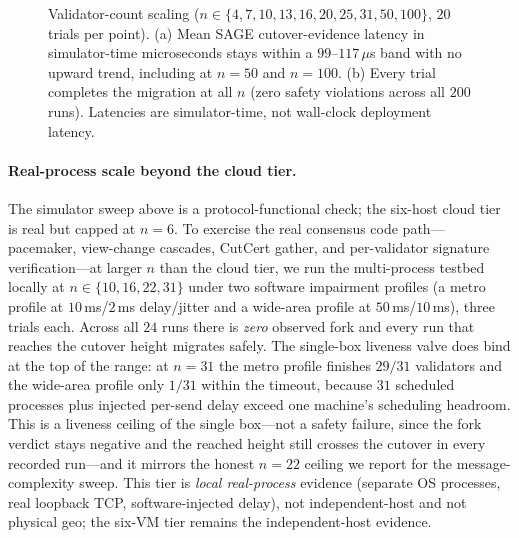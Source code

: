 \documentclass[journal]{IEEEtran}
\theoremstyle{definition}
\theoremstyle{remark}
\begin{document}
\begin{figure}[t]
\centering
{}
\caption{Validator-count scaling ($n\in\{4,7,10,13,16,20,25,31,50,100\}$, $20$ trials per point).
(a) Mean SAGE cutover-evidence latency in simulator-time microseconds stays within a $99$--$117\,\mu$s
band with no upward trend, including at $n{=}50$ and $n{=}100$. (b) Every trial completes the
migration at all $n$ (zero safety violations across all $200$ runs). Latencies are
simulator-time, not wall-clock deployment latency.}
\label{fig:scaling}
\end{figure}

\paragraph{Real-process scale beyond the cloud tier.}
The simulator sweep above is a protocol-functional check; the six-host cloud tier is real but
capped at $n{=}6$. To exercise the real consensus code path---pacemaker, view-change cascades,
CutCert gather, and per-validator signature verification---at larger $n$ than the cloud tier, we
run the multi-process testbed locally at $n\in\{10,16,22,31\}$ under two software impairment
profiles (a metro profile at $10\,$ms/$2\,$ms delay/jitter and a wide-area profile at
$50\,$ms/$10\,$ms), three trials each. Across all $24$ runs there is \emph{zero} observed fork and
every run that reaches the cutover height migrates safely. The single-box liveness valve does bind
at the top of the range: at $n{=}31$ the metro profile finishes $29/31$ validators and the
wide-area profile only $1/31$ within the timeout, because $31$ scheduled processes plus injected
per-send delay exceed one machine's scheduling headroom. This is a liveness ceiling of the
single box---not a safety failure, since the fork verdict stays negative and the reached height
still crosses the cutover in every recorded run---and it mirrors the honest $n{=}22$ ceiling we
report for the message-complexity sweep. This tier is \emph{local real-process} evidence (separate
OS processes, real loopback TCP, software-injected delay), not independent-host and not physical
geo; the six-VM tier remains the independent-host evidence.
\end{document}
